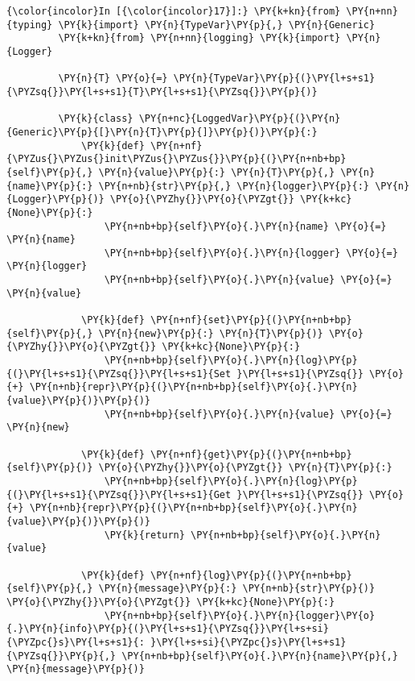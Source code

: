     \begin{Verbatim}[commandchars=\\\{\}]
{\color{incolor}In [{\color{incolor}17}]:} \PY{k+kn}{from} \PY{n+nn}{typing} \PY{k}{import} \PY{n}{TypeVar}\PY{p}{,} \PY{n}{Generic}
         \PY{k+kn}{from} \PY{n+nn}{logging} \PY{k}{import} \PY{n}{Logger}
         
         \PY{n}{T} \PY{o}{=} \PY{n}{TypeVar}\PY{p}{(}\PY{l+s+s1}{\PYZsq{}}\PY{l+s+s1}{T}\PY{l+s+s1}{\PYZsq{}}\PY{p}{)}
         
         \PY{k}{class} \PY{n+nc}{LoggedVar}\PY{p}{(}\PY{n}{Generic}\PY{p}{[}\PY{n}{T}\PY{p}{]}\PY{p}{)}\PY{p}{:}
             \PY{k}{def} \PY{n+nf}{\PYZus{}\PYZus{}init\PYZus{}\PYZus{}}\PY{p}{(}\PY{n+nb+bp}{self}\PY{p}{,} \PY{n}{value}\PY{p}{:} \PY{n}{T}\PY{p}{,} \PY{n}{name}\PY{p}{:} \PY{n+nb}{str}\PY{p}{,} \PY{n}{logger}\PY{p}{:} \PY{n}{Logger}\PY{p}{)} \PY{o}{\PYZhy{}}\PY{o}{\PYZgt{}} \PY{k+kc}{None}\PY{p}{:}
                 \PY{n+nb+bp}{self}\PY{o}{.}\PY{n}{name} \PY{o}{=} \PY{n}{name}
                 \PY{n+nb+bp}{self}\PY{o}{.}\PY{n}{logger} \PY{o}{=} \PY{n}{logger}
                 \PY{n+nb+bp}{self}\PY{o}{.}\PY{n}{value} \PY{o}{=} \PY{n}{value}
         
             \PY{k}{def} \PY{n+nf}{set}\PY{p}{(}\PY{n+nb+bp}{self}\PY{p}{,} \PY{n}{new}\PY{p}{:} \PY{n}{T}\PY{p}{)} \PY{o}{\PYZhy{}}\PY{o}{\PYZgt{}} \PY{k+kc}{None}\PY{p}{:}
                 \PY{n+nb+bp}{self}\PY{o}{.}\PY{n}{log}\PY{p}{(}\PY{l+s+s1}{\PYZsq{}}\PY{l+s+s1}{Set }\PY{l+s+s1}{\PYZsq{}} \PY{o}{+} \PY{n+nb}{repr}\PY{p}{(}\PY{n+nb+bp}{self}\PY{o}{.}\PY{n}{value}\PY{p}{)}\PY{p}{)}
                 \PY{n+nb+bp}{self}\PY{o}{.}\PY{n}{value} \PY{o}{=} \PY{n}{new}
         
             \PY{k}{def} \PY{n+nf}{get}\PY{p}{(}\PY{n+nb+bp}{self}\PY{p}{)} \PY{o}{\PYZhy{}}\PY{o}{\PYZgt{}} \PY{n}{T}\PY{p}{:}
                 \PY{n+nb+bp}{self}\PY{o}{.}\PY{n}{log}\PY{p}{(}\PY{l+s+s1}{\PYZsq{}}\PY{l+s+s1}{Get }\PY{l+s+s1}{\PYZsq{}} \PY{o}{+} \PY{n+nb}{repr}\PY{p}{(}\PY{n+nb+bp}{self}\PY{o}{.}\PY{n}{value}\PY{p}{)}\PY{p}{)}
                 \PY{k}{return} \PY{n+nb+bp}{self}\PY{o}{.}\PY{n}{value}
         
             \PY{k}{def} \PY{n+nf}{log}\PY{p}{(}\PY{n+nb+bp}{self}\PY{p}{,} \PY{n}{message}\PY{p}{:} \PY{n+nb}{str}\PY{p}{)} \PY{o}{\PYZhy{}}\PY{o}{\PYZgt{}} \PY{k+kc}{None}\PY{p}{:}
                 \PY{n+nb+bp}{self}\PY{o}{.}\PY{n}{logger}\PY{o}{.}\PY{n}{info}\PY{p}{(}\PY{l+s+s1}{\PYZsq{}}\PY{l+s+si}{\PYZpc{}s}\PY{l+s+s1}{: }\PY{l+s+si}{\PYZpc{}s}\PY{l+s+s1}{\PYZsq{}}\PY{p}{,} \PY{n+nb+bp}{self}\PY{o}{.}\PY{n}{name}\PY{p}{,} \PY{n}{message}\PY{p}{)}
\end{Verbatim}


